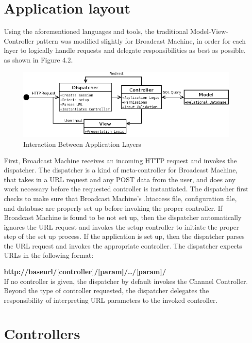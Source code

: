 \documentclass[a4paper,12pt]{report}
\begin{document}
\section{Application layout}
Using the aforementioned languages and tools, the traditional Model-View-Controller pattern was modified slightly for Broadcast Machine, in order for each layer to logically handle requests and delegate responsibilities as best as possible, as shown in Figure 4.2.

\begin{figure}[htp]
\begin{center}
\includegraphics[scale=0.5]{./images/flow.png}
\end{center}
\caption{Interaction Between Application Layers}
\end{figure}

First, Broadcast Machine receives an incoming HTTP request and invokes the dispatcher. The dispatcher is a kind of meta-controller for Broadcast Machine, that takes in a URL request and any POST data from the user, and does any work necessary before the requested controller is instantiated. The dispatcher first checks to make sure that Broadcast Machine's .htaccess file, configuration file, and database are properly set up before invoking the proper controller. If Broadcast Machine is found to be not set up, then the dispatcher automatically ignores the URL request and invokes the setup controller to initiate the proper step of the set up process. If the application is set up, then the dispatcher parses the URL request and invokes the appropriate controller. The dispatcher expects URLs in the following format:

\textbf{http://baseurl/[controller]/[param]/../[param]/} \\

If no controller is given, the dispatcher by default invokes the Channel Controller. Beyond the type of controller requested, the dispatcher delegates the responsibility of interpreting URL parameters to the invoked controller.

\section{Controllers}
\end{document}
